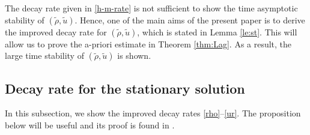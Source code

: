 \documentclass[a4paper,12pt,draft]{article}
\theoremstyle{remark}
\newtheorem{remark}[theorem]{Remark}
\def\ut{\tilde{u}}
\def\rt{\tilde{\rho}}
\begin{document}
The decay rate given in \eqref{h-m-rate} is not sufficient to show the time asymptotic stability of $(\rt,\ut)$. Hence, one of the main aims of the present paper is to derive the improved decay rate for $(\rt,\ut)$, which is stated in Lemma \ref{le:st}. This will allow us to prove the a-priori estimate in Theorem \ref{thm:Lag}. As a result, the large time stability of $(\rt,\ut)$ is shown. 

\subsection{Decay rate for the stationary solution}\label{ssec:stRate}
In this subsection, we show the improved decay rates \eqref{rho}--\eqref{ur}. The proposition below will be useful and its proof is found in \cite{h-m21}. 
\end{document}
